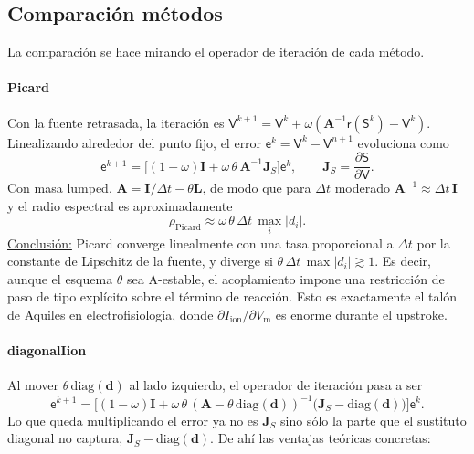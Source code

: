\documentclass[11pt,a4paper]{article}
\newcommand{\Vm}{V_{\text{m}}}
\newcommand{\Iion}{I_{\mathrm{ion}}}
\newcommand{\Lop}{\mathbf{L}}
\newcommand{\Aimp}{\mathbf{A}}
\begin{document}
\subsection{Comparación métodos}

La comparación se hace mirando el operador de iteración de cada método.

\paragraph{Picard} Con la fuente retrasada, la iteración es $\mathsf{V}^{k+1}=\mathsf{V}^k+\omega(\Aimp^{-1}\mathsf{r}(\mathsf{S}^k)-\mathsf{V}^k)$. Linealizando alrededor del punto fijo, el error $\mathsf{e}^k=\mathsf{V}^k-\mathsf{V}^{n+1}$ evoluciona como
$$
\mathsf{e}^{k+1}=\big[(1-\omega)\mathbf{I}+\omega\,\theta\,\Aimp^{-1}\mathbf{J}_S\big]\mathsf{e}^k,\qquad \mathbf{J}_S=\frac{\partial\mathsf{S}}{\partial\mathsf{V}}.
$$
Con masa lumped, $\Aimp=\mathbf{I}/\Delta t-\theta\Lop$, de modo que para $\Delta t$ moderado $\Aimp^{-1}\approx\Delta t\,\mathbf{I}$ y el radio espectral es aproximadamente
$$
\rho_{\text{Picard}}\approx\omega\,\theta\,\Delta t\,\max_i|d_i| .
$$
\underline{Conclusión:} Picard converge linealmente con una tasa proporcional a $\Delta t$ por la constante de Lipschitz de la fuente, y diverge si $\theta\,\Delta t\,\max|d_i|\gtrsim1$. Es decir, aunque el esquema $\theta$ sea A-estable, el acoplamiento impone una restricción de paso de tipo explícito sobre el término de reacción. Esto es exactamente el talón de Aquiles en electrofisiología, donde $\partial\Iion/\partial\Vm$ es enorme durante el upstroke.

\paragraph{diagonalIion} Al mover $\theta\,\mathrm{diag}(\mathbf{d})$ al lado izquierdo, el operador de iteración pasa a ser
$$
\mathsf{e}^{k+1}=\big[(1-\omega)\mathbf{I}+\omega\,\theta\,(\Aimp-\theta\,\mathrm{diag}(\mathbf{d}))^{-1}\big(\mathbf{J}_S-\mathrm{diag}(\mathbf{d})\big)\big]\mathsf{e}^k .
$$
Lo que queda multiplicando el error ya no es $\mathbf{J}_S$ sino sólo la parte que el sustituto diagonal no captura, $\mathbf{J}_S-\mathrm{diag}(\mathbf{d})$. De ahí las ventajas teóricas concretas:
\end{document}
